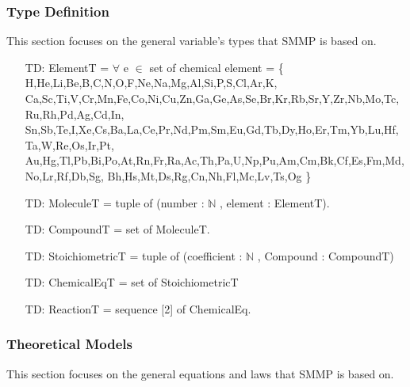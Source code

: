 \documentclass[12pt]{article}
\newcounter{typenum} %
\begin{document}
\subsubsection{Type Definition}\label{Type_Detention}

This section focuses on the general variable's types that SMMP is based on.  
\begin{itemize}
\item[TD\refstepcounter{typenum}\thetypenum \label{elementT}:] ElementT = $\forall$ e $\in$ set of chemical element = 
\{ H,He,Li,Be,B,C,N,O,F,Ne,Na,Mg,Al,Si,P,S,Cl,Ar,K,
Ca,Sc,Ti,V,Cr,Mn,Fe,Co,Ni,Cu,Zn,Ga,Ge,As,Se,Br,Kr,Rb,Sr,Y,Zr,Nb,Mo,Tc,Ru,Rh,Pd,Ag,Cd,In,
Sn,Sb,Te,I,Xe,Cs,Ba,La,Ce,Pr,Nd,Pm,Sm,Eu,Gd,Tb,Dy,Ho,Er,Tm,Yb,Lu,Hf,Ta,W,Re,Os,Ir,Pt,
Au,Hg,Tl,Pb,Bi,Po,At,Rn,Fr,Ra,Ac,Th,Pa,U,Np,Pu,Am,Cm,Bk,Cf,Es,Fm,Md,No,Lr,Rf,Db,Sg,
Bh,Hs,Mt,Ds,Rg,Cn,Nh,Fl,Mc,Lv,Ts,Og \}
\item[TD\refstepcounter{typenum}\thetypenum \label{MoleculeT}:] MoleculeT = tuple of (number : $\mathbb{N}$ , element : ElementT).
\item[TD\refstepcounter{typenum}\thetypenum \label{CompoundT}:]  CompoundT =   set of MoleculeT.
\item[TD\refstepcounter{typenum}\thetypenum \label{StoichiometricT}:]  StoichiometricT =   tuple of (coefficient : $\mathbb{N}$ , Compound : CompoundT)
\item[TD\refstepcounter{typenum}\thetypenum \label{ChemicalEqT}:] ChemicalEqT = set of StoichiometricT \item[TD\refstepcounter{typenum}\thetypenum \label{ReactionT}:] ReactionT =  sequence [2] of ChemicalEq.
\end{itemize}



\subsubsection{Theoretical Models}\label{sec_theoretical}

This section focuses on the general equations and laws that SMMP is based on.  

~\newline
\end{document}
